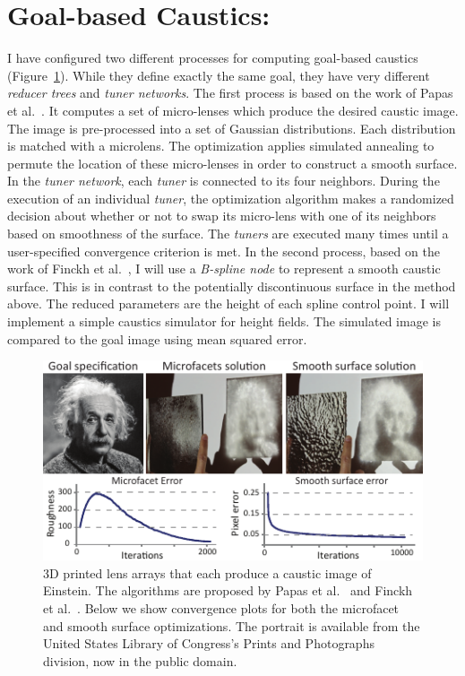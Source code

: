 \section{Goal-based Caustics:}
I have configured two different processes for computing goal-based caustics (Figure~\ref{fig:caust2}). While they define exactly the same goal, they have very different \emph{reducer trees} and \emph{tuner networks}.
The first process is based on the work of Papas et al.~.
It computes a set of micro-lenses which produce the desired caustic image. The image is pre-processed into a set of Gaussian distributions. Each distribution is matched with a microlens. The optimization applies simulated annealing to permute the location of these micro-lenses in order to construct a smooth surface. In the \emph{tuner network}, each \emph{tuner} is connected to its four neighbors. During the execution of an individual \emph{tuner}, the optimization algorithm makes a randomized decision about whether or not to swap its micro-lens with one of its neighbors based on smoothness of the surface. 
The \emph{tuners} are executed many times until a user-specified convergence criterion is met. 
In the second process, based on the work of Finckh et al.~, I will use a \emph{B-spline node} to represent a smooth caustic surface.
This is in contrast to the potentially discontinuous surface in the method above.
The reduced parameters are the height of each spline control point.
I will implement a simple caustics simulator for height fields.
The simulated image is compared to the goal image using mean squared error.

\begin{figure}
\centering
\includegraphics[width=0.65\linewidth]{figure/fig_caustic.pdf}
\caption {3D printed lens arrays that each produce a caustic image of Einstein. The algorithms are proposed by Papas et al.~ and Finckh et al.~.
Below we show convergence plots for both the microfacet and smooth surface optimizations.
The portrait is available from the United States Library of Congress's Prints and Photographs division,
now in the public domain.
}
\label{fig:caust2}
\end{figure}

